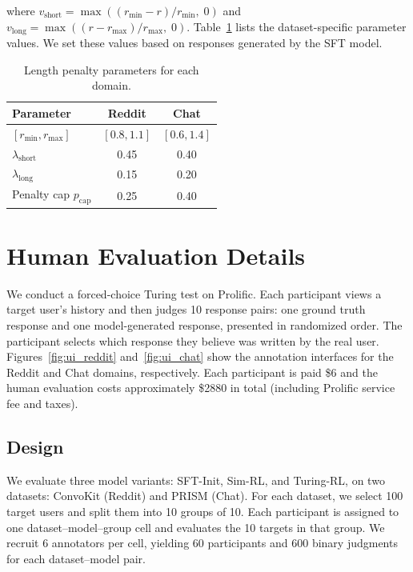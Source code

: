 \documentclass[11pt]{article}
\begin{document}
where $v_{\mathrm{short}} = \max((r_{\min} - r) / r_{\min},\; 0)$ and $v_{\mathrm{long}} = \max((r - r_{\max}) / r_{\max},\; 0)$. Table~\ref{tab:reward-shaping} lists the dataset-specific parameter values. We set these values based on responses generated by the SFT model.

\begin{table}[h]
\centering
\small
\begin{tabular}{lcc}
\toprule
\textbf{Parameter} & \textbf{Reddit} & \textbf{Chat} \\
\midrule
$[r_{\min}, r_{\max}]$ & $[0.8, 1.1]$ & $[0.6, 1.4]$ \\
$\lambda_{\mathrm{short}}$ & 0.45 & 0.40 \\
$\lambda_{\mathrm{long}}$ & 0.15 & 0.20 \\
Penalty cap $p_{\mathrm{cap}}$ & 0.25 & 0.40 \\
\bottomrule
\end{tabular}
\caption{Length penalty parameters for each domain.}
\label{tab:reward-shaping}
\end{table}


\section{Human Evaluation Details}
\label{app:human-eval}

We conduct a forced-choice Turing test on Prolific. Each participant views a target user's history and then judges 10 response pairs: one ground truth response and one model-generated response, presented in randomized order. The participant selects which response they believe was written by the real user. Figures~\ref{fig:ui_reddit} and~\ref{fig:ui_chat} show the annotation interfaces for the Reddit and Chat domains, respectively. Each participant is paid \$6 and the human evaluation costs approximately \$2880 in total (including Prolific service fee and taxes). 

\subsection{Design}
We evaluate three model variants: SFT-Init, Sim-RL, and Turing-RL, on two datasets: ConvoKit (Reddit) and PRISM (Chat). For each dataset, we select 100 target users and split them into 10 groups of 10. Each participant is assigned to one dataset--model--group cell and evaluates the 10 targets in that group. We recruit 6 annotators per cell, yielding 60 participants and 600 binary judgments for each dataset--model pair.
\end{document}
